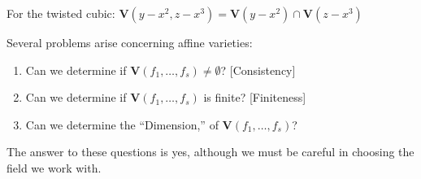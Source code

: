 \documentclass[crop=false,class=article,oneside]{standalone}
\begin{document}
            \begin{example}
                For the twisted cubic:
                $\mathbf{V}(y-x^{2},z-x^{3})%
                 =\mathbf{V}(y-x^{2})\cap\mathbf{V}(z-x^{3})$
            \end{example}
            Several problems arise concerning affine varieties:
            \begin{enumerate}
                \item Can we determine if
                      $\mathbf{V}(f_{1},\hdots,f_{s})\ne\emptyset$?
                      \hfill[Consistency]
                \item Can we determine if
                      $\mathbf{V}(f_{1},\hdots,f_{s})$ is finite?
                      \hfill[Finiteness]
                \item Can we determine the ``Dimension,'' of
                      $\mathbf{V}(f_{1},\hdots,f_{s})$?
            \end{enumerate}
            The answer to these questions is yes,
            although we must be careful in choosing
            the field we work with. 
\end{document}

